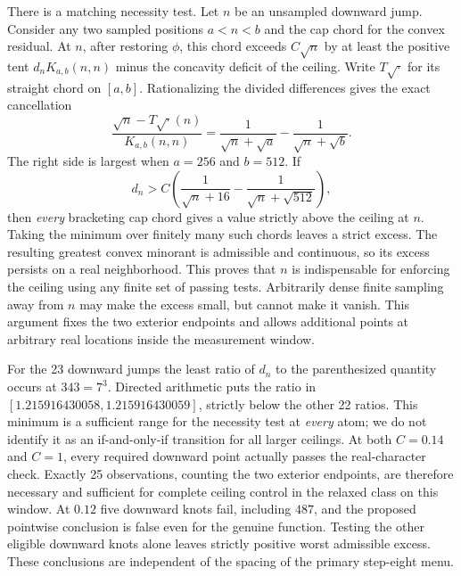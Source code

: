 \documentclass[12pt,letterpaper]{article}
\begin{document}
There is a matching necessity test. Let \(n\) be an unsampled downward jump. Consider any two sampled positions \(a<n<b\) and the cap chord for the convex residual. At \(n\), after restoring \(\phi\), this chord exceeds \(C\sqrt n\) by at least the positive tent \(d_n K_{a,b}(n,n)\) minus the concavity deficit of the ceiling. Write \(T\sqrt{\cdot}\) for its straight chord on \([a,b]\). Rationalizing the divided differences gives the exact cancellation
\[
 \frac{\sqrt n-T\sqrt{\cdot}(n)}{K_{a,b}(n,n)}
  =\frac{1}{\sqrt n+\sqrt a}-\frac{1}{\sqrt n+\sqrt b}.
\]
The right side is largest when \(a=256\) and \(b=512\). If
\[
 d_n>C\left(\frac{1}{\sqrt n+16}-\frac{1}{\sqrt n+\sqrt{512}}\right),
\]
then \emph{every} bracketing cap chord gives a value strictly above the ceiling at \(n\). Taking the minimum over finitely many such chords leaves a strict excess. The resulting greatest convex minorant is admissible and continuous, so its excess persists on a real neighborhood. This proves that \(n\) is indispensable for enforcing the ceiling using any finite set of passing tests. Arbitrarily dense finite sampling away from \(n\) may make the excess small, but cannot make it vanish. This argument fixes the two exterior endpoints and allows additional points at arbitrary real locations inside the measurement window.

For the 23 downward jumps the least ratio of \(d_n\) to the parenthesized quantity occurs at \(343=7^3\). Directed arithmetic puts the ratio in \([1.215916430058,1.215916430059]\), strictly below the other 22 ratios. This minimum is a sufficient range for the necessity test at \emph{every} atom; we do not identify it as an if-and-only-if transition for all larger ceilings. At both \(C=0.14\) and \(C=1\), every required downward point actually passes the real-character check. Exactly 25 observations, counting the two exterior endpoints, are therefore necessary and sufficient for complete ceiling control in the relaxed class on this window. At \(0.12\) five downward knots fail, including \(487\), and the proposed pointwise conclusion is false even for the genuine function. Testing the other eligible downward knots alone leaves strictly positive worst admissible excess. These conclusions are independent of the spacing of the primary step-eight menu.
\end{document}
